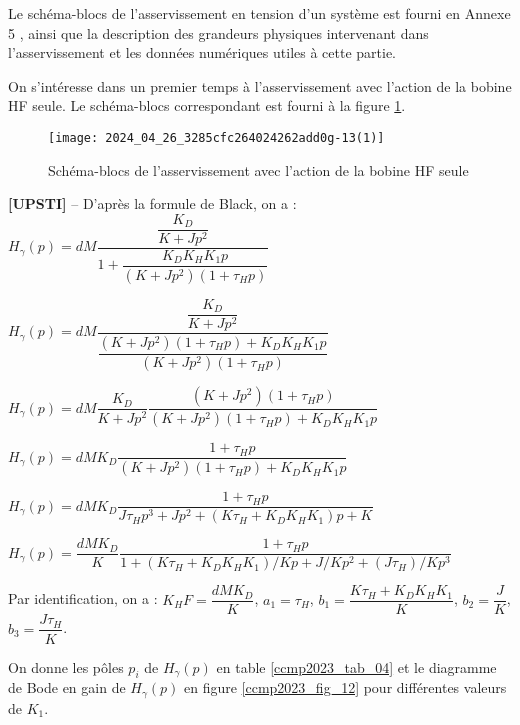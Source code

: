 Le schéma-blocs de l'asservissement en tension d'un système est fourni en Annexe 5 , ainsi que la description des grandeurs physiques intervenant dans l'asservissement et les données numériques utiles à cette partie.

On s'intéresse dans un premier temps à l'asservissement avec l'action de la bobine HF seule. Le schéma-blocs correspondant est fourni à la figure \ref{ccmp2023_fig_11}.

\begin{figure}[!h]
\centering
\texttt{[image: 2024\_04\_26\_3285cfc264024262add0g-13(1)]}
\caption{\label{ccmp2023_fig_11} Schéma-blocs de l'asservissement avec l'action de la bobine HF seule}
\end{figure}
\fi


\ifprof
\begin{corrige}
\textbf{[UPSTI]} --
D’après la formule de Black, on a :
$H_{\gamma} (p)=dM \dfrac{\dfrac{K_D}{K+Jp^2}}{1+\dfrac{K_D K_H K_1 p}{(K+Jp^2)(1+\tau_H p)}}$

$H_{\gamma} (p)=dM \dfrac{\dfrac{K_D}{K+Jp^2}}{\dfrac{(K+Jp^2)(1+\tau_H p)+K_D K_H K_1 p}{(K+Jp^2)(1+\tau_H p)}}$

$H_{\gamma} (p)=dM \dfrac{K_D}{K+Jp^2}  \dfrac{(K+Jp^2)(1+\tau_H p)}{(K+Jp^2)(1+\tau_H p)+K_D K_H K_1 p}$

$H_{\gamma} (p)=dMK_D  \dfrac{1+\tau_H p}{(K+Jp^2)(1+\tau_H p)+K_D K_H K_1 p}$

$H_{\gamma} (p)=dMK_D  \dfrac{1+\tau_H p}{J\tau_H p^3+Jp^2+(K\tau_H+K_D K_H K_1)p+K}$

$H_{\gamma} (p)=\dfrac{dMK_D}{K}  \dfrac{1+\tau_H p}{1+(K\tau_H+K_D K_H K_1)/K p+J/K p^2+(J\tau_H)/K p^3  }$

Par identification, on a :
$K_HF=\dfrac{dMK_D}{K}$, 
$a_1=\tau_H$, 
$b_1=\dfrac{K\tau_H+K_D K_H K_1}{K}$, 
$b_2=\dfrac{J}{K}$, 
$b_3=\dfrac{J\tau_H}{K}$.

\end{corrige}
\else
\fi

\ifprof
\else
On donne les pôles $p_{i}$ de $H_{\gamma}(p)$ en table \ref{ccmp2023_tab_04} et le diagramme de Bode en gain de $H_{\gamma}(p)$ en figure \ref{ccmp2023_fig_12} pour différentes valeurs de $K_{1}$.


